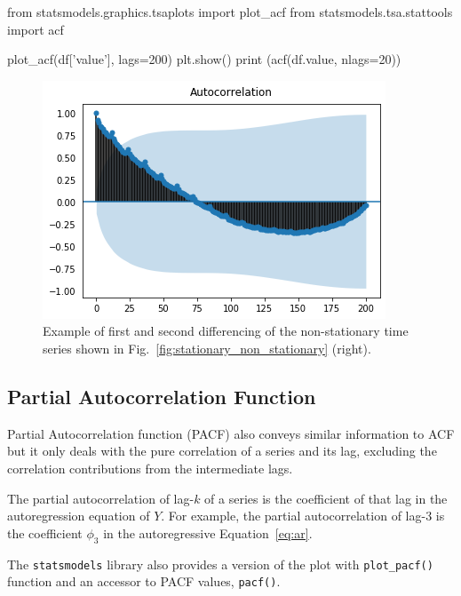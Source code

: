 \begin{ipython}
from statsmodels.graphics.tsaplots import plot_acf
from statsmodels.tsa.stattools import acf

plot_acf(df['value'], lags=200)
plt.show()
print (acf(df.value, nlags=20))
\end{ipython}
\begin{ioutput}
[1.        0.92056815 0.88782519 0.85385862 0.84052841 0.82523769
0.79629658 0.77950157 0.75953251 0.74337588 0.74521347 0.74134847
0.78031252 0.71424686 0.68014097 0.65401657 0.63791893 0.62349882
0.60171747 0.58230335 0.5638103 ]
\end{ioutput}
    
\begin{figure}[htb]
	\centering
	\includegraphics[width=0.7\linewidth]{figures/acf_plot2.png}
	\caption{Example of first and second differencing of the non-stationary time series shown in Fig.~\ref{fig:stationary_non_stationary} (right).}
	\label{fig:acf2}
\end{figure}
    
\subsection{Partial Autocorrelation Function}
\label{partial-autocorrelation-function}

Partial Autocorrelation function (PACF) also conveys similar information to ACF but it only deals with the pure correlation of a series and its lag, excluding the correlation contributions from the intermediate lags.

The partial autocorrelation of lag-\(k\) of a series is the coefficient of that lag in the autoregression equation of \(Y\). For example, the partial autocorrelation of lag-3 is the coefficient \(\phi_3\) in the autoregressive Equation~\ref{eq:ar}.

The \texttt{statsmodels} library also provides a version of the plot with \texttt{plot\_pacf()} function and an accessor to PACF values, \texttt{pacf()}.

